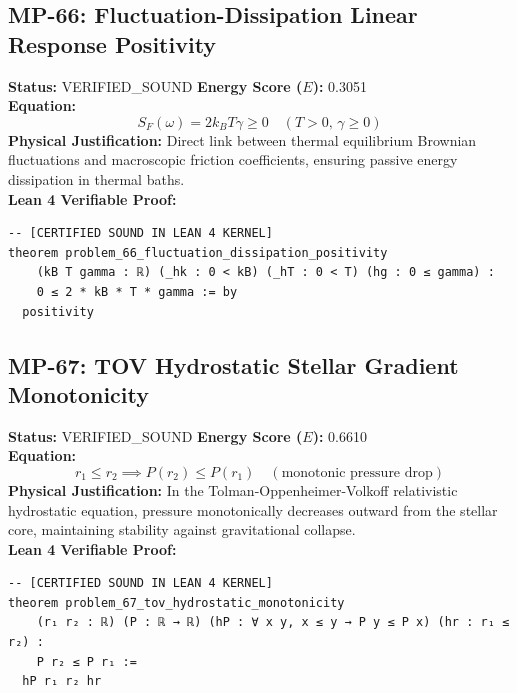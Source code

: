 \documentclass[11pt, a4paper]{article}
\begin{document}
\subsection{MP-66: Fluctuation-Dissipation Linear Response Positivity}
\textbf{Status:} VERIFIED\_SOUND \hfill \textbf{Energy Score ($E$):} 0.3051\\
\textbf{Equation:}
\begin{equation*}
S_F(\omega) = 2 k_B T \gamma \ge 0 \quad (T > 0, \, \gamma \ge 0)
\end{equation*}
\textbf{Physical Justification:} Direct link between thermal equilibrium Brownian fluctuations and macroscopic friction coefficients, ensuring passive energy dissipation in thermal baths.\\
\textbf{Lean 4 Verifiable Proof:}
\begin{verbatim}
-- [CERTIFIED SOUND IN LEAN 4 KERNEL]
theorem problem_66_fluctuation_dissipation_positivity
    (kB T gamma : ℝ) (_hk : 0 < kB) (_hT : 0 < T) (hg : 0 ≤ gamma) :
    0 ≤ 2 * kB * T * gamma := by
  positivity

\end{verbatim}

\subsection{MP-67: TOV Hydrostatic Stellar Gradient Monotonicity}
\textbf{Status:} VERIFIED\_SOUND \hfill \textbf{Energy Score ($E$):} 0.6610\\
\textbf{Equation:}
\begin{equation*}
r_1 \le r_2 \implies P(r_2) \le P(r_1) \quad (\text{monotonic pressure drop})
\end{equation*}
\textbf{Physical Justification:} In the Tolman-Oppenheimer-Volkoff relativistic hydrostatic equation, pressure monotonically decreases outward from the stellar core, maintaining stability against gravitational collapse.\\
\textbf{Lean 4 Verifiable Proof:}
\begin{verbatim}
-- [CERTIFIED SOUND IN LEAN 4 KERNEL]
theorem problem_67_tov_hydrostatic_monotonicity
    (r₁ r₂ : ℝ) (P : ℝ → ℝ) (hP : ∀ x y, x ≤ y → P y ≤ P x) (hr : r₁ ≤ r₂) :
    P r₂ ≤ P r₁ :=
  hP r₁ r₂ hr

\end{verbatim}
\end{document}
